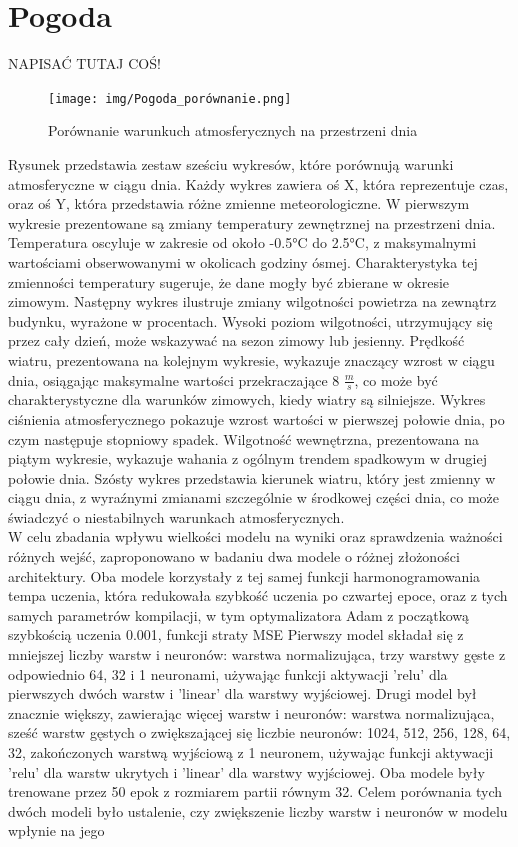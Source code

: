 \documentclass[a4paper,twoside,12pt]{book}
\begin{document}
\chapter{Pogoda}
\label{ch:0X}

NAPISAĆ TUTAJ COŚ!\\

\begin{figure}[!h]
	\centering
	\texttt{[image: img/Pogoda\_porównanie.png]}
	\caption{Porównanie warunkuch atmosferycznych na przestrzeni dnia}
	\label{fig:etykieta-rysunku}
\end{figure}
Rysunek przedstawia zestaw sześciu wykresów, które porównują warunki atmosferyczne w ciągu dnia. Każdy wykres zawiera oś X, która reprezentuje czas, oraz oś Y, która przedstawia różne zmienne meteorologiczne. W pierwszym wykresie prezentowane są zmiany temperatury zewnętrznej na przestrzeni dnia. Temperatura oscyluje w zakresie od około -0.5°C do 2.5°C, z maksymalnymi wartościami obserwowanymi w okolicach godziny ósmej. Charakterystyka tej zmienności temperatury sugeruje, że dane mogły być zbierane w okresie zimowym. Następny wykres ilustruje zmiany wilgotności powietrza na zewnątrz budynku, wyrażone w procentach. Wysoki poziom wilgotności, utrzymujący się przez cały dzień, może wskazywać na sezon zimowy lub jesienny. Prędkość wiatru, prezentowana na kolejnym wykresie, wykazuje znaczący wzrost w ciągu dnia, osiągając maksymalne wartości przekraczające 8  $\frac{m}{s}$, co może być charakterystyczne dla warunków zimowych, kiedy wiatry są silniejsze. Wykres ciśnienia atmosferycznego pokazuje wzrost wartości w pierwszej połowie dnia, po czym następuje stopniowy spadek. Wilgotność wewnętrzna, prezentowana na piątym wykresie, wykazuje wahania z ogólnym trendem spadkowym w drugiej połowie dnia. Szósty wykres przedstawia kierunek wiatru, który jest zmienny w ciągu dnia, z wyraźnymi zmianami szczególnie w środkowej części dnia, co może świadczyć o niestabilnych warunkach atmosferycznych.\\

W celu zbadania wpływu wielkości modelu na wyniki oraz sprawdzenia ważności różnych wejść, zaproponowano w badaniu dwa modele o różnej złożoności architektury. Oba modele korzystały z tej samej funkcji harmonogramowania tempa uczenia, która redukowała szybkość uczenia po czwartej epoce, oraz z tych samych parametrów kompilacji, w tym optymalizatora Adam z początkową szybkością uczenia 0.001, funkcji straty MSE
Pierwszy model składał się z mniejszej liczby warstw i neuronów: warstwa normalizująca, trzy warstwy gęste z odpowiednio 64, 32 i 1 neuronami, używając funkcji aktywacji 'relu' dla pierwszych dwóch warstw i 'linear' dla warstwy wyjściowej.
Drugi model był znacznie większy, zawierając więcej warstw i neuronów: warstwa normalizująca, sześć warstw gęstych o zwiększającej się liczbie neuronów: 1024, 512, 256, 128, 64, 32, zakończonych warstwą wyjściową z 1 neuronem, używając funkcji aktywacji 'relu' dla warstw ukrytych i 'linear' dla warstwy wyjściowej.
Oba modele były trenowane przez 50 epok z rozmiarem partii równym 32. Celem porównania tych dwóch modeli było ustalenie, czy zwiększenie liczby warstw i neuronów w modelu wpłynie na jego
\end{document}
